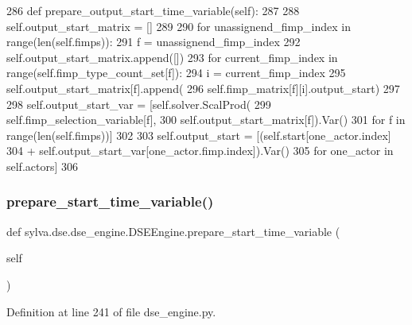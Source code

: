 \begin{DoxyCode}
286     \textcolor{keyword}{def }prepare\_output\_start\_time\_variable(self):
287 
288         self.output\_start\_matrix = []
289 
290         \textcolor{keywordflow}{for} unassignend\_fimp\_index \textcolor{keywordflow}{in} range(len(self.fimps)):
291             f = unassignend\_fimp\_index
292             self.output\_start\_matrix.append([])
293             \textcolor{keywordflow}{for} current\_fimp\_index \textcolor{keywordflow}{in} range(self.fimp\_type\_count\_set[f]):
294                 i = current\_fimp\_index
295                 self.output\_start\_matrix[f].append(
296                     self.fimp\_matrix[f][i].output\_start)
297 
298         self.output\_start\_var = [self.solver.ScalProd(
299             self.fimp\_selection\_variable[f],
300             self.output\_start\_matrix[f]).Var()
301             \textcolor{keywordflow}{for} f \textcolor{keywordflow}{in} range(len(self.fimps))]
302 
303         self.output\_start = [(self.start[one\_actor.index]
304                               + self.output\_start\_var[one\_actor.fimp.index]).Var()
305                              \textcolor{keywordflow}{for} one\_actor \textcolor{keywordflow}{in} self.actors]
306 
\end{DoxyCode}
\mbox{\label{classsylva_1_1dse_1_1dse__engine_1_1_d_s_e_engine_ae3e382b3415f1afc675282c1040e2dac}} 
\subsubsection{\texorpdfstring{prepare\+\_\+start\+\_\+time\+\_\+variable()}{prepare\_start\_time\_variable()}}
{\footnotesize\ttfamily def sylva.\+dse.\+dse\+\_\+engine.\+D\+S\+E\+Engine.\+prepare\+\_\+start\+\_\+time\+\_\+variable (\begin{DoxyParamCaption}\item[{}]{self }\end{DoxyParamCaption})}



Definition at line 241 of file dse\+\_\+engine.\+py.


